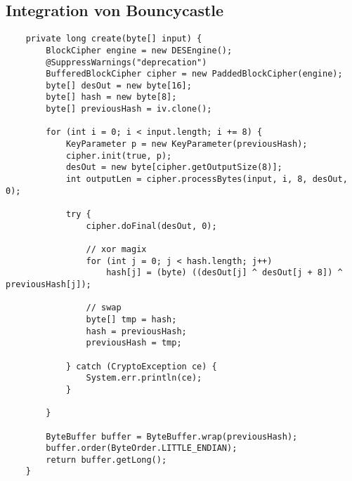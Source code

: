\documentclass{beamer}
\begin{document}
\begin{frame}
\section{Integration von Bouncycastle}
\begin{lstlisting}
 	private long create(byte[] input) {
		BlockCipher engine = new DESEngine();
		@SuppressWarnings("deprecation")
		BufferedBlockCipher cipher = new PaddedBlockCipher(engine);
		byte[] desOut = new byte[16];
		byte[] hash = new byte[8];
		byte[] previousHash = iv.clone();

		for (int i = 0; i < input.length; i += 8) {
			KeyParameter p = new KeyParameter(previousHash);
			cipher.init(true, p);
			desOut = new byte[cipher.getOutputSize(8)];
			int outputLen = cipher.processBytes(input, i, 8, desOut, 0);

			try {
				cipher.doFinal(desOut, 0);

				// xor magix
				for (int j = 0; j < hash.length; j++)
					hash[j] = (byte) ((desOut[j] ^ desOut[j + 8]) ^ previousHash[j]);

				// swap
				byte[] tmp = hash;
				hash = previousHash;
				previousHash = tmp;

			} catch (CryptoException ce) {
				System.err.println(ce);
			}

		}

		ByteBuffer buffer = ByteBuffer.wrap(previousHash);
		buffer.order(ByteOrder.LITTLE_ENDIAN);
		return buffer.getLong();
	}

\end{lstlisting}

\end{frame}
\end{document}
